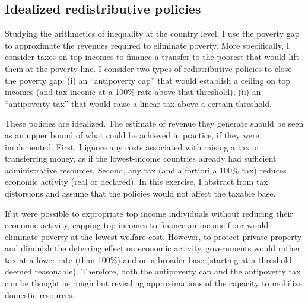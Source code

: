 \subsection{Idealized redistributive policies}

Studying the arithmetics of inequality at the country level, I use the poverty gap to approximate the revenues required to eliminate poverty. 
More specifically, I consider taxes on top incomes to finance a transfer to the poorest that would lift them at the poverty line. I consider two types of redistributive policies to close the poverty gap: (i) an ``antipoverty cap'' that would establish a ceiling on top incomes (and tax income at a 100\% rate above that threshold); (ii) an ``antipoverty tax'' that would raise a linear tax above a certain threshold. 

These policies are idealized. The estimate of revenue they generate should be seen as an upper bound of what could be achieved in practice, if they were implemented. First, I ignore any costs associated with raising a tax or transferring money, as if the lowest-income countries already had sufficient administrative resources. Second, any tax (and a fortiori a 100\% tax) reduces economic activity (real or declared). In this exercise, I abstract from tax distorsions and assume that the policies would not affect the taxable base.

If it were possible to expropriate top income individuals 
without reducing their economic activity, capping top incomes to finance an income floor would eliminate poverty at the lowest welfare cost. 
However, to protect private property and diminish the deterring effect on economic activity, governments would rather tax at a lower rate (than 100\%) and on a broader base (starting at a threshold deemed reasonable). 
Therefore, both the antipoverty cap and the antipoverty tax can be thought as rough but revealing approximations of the capacity to mobilize domestic resources.

